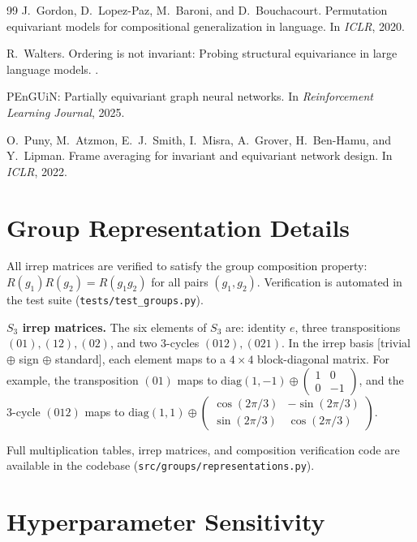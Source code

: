 \documentclass[10pt, letterpaper]{article}
\begin{document}
\begin{thebibliography}{99}
J.~Gordon, D.~Lopez-Paz, M.~Baroni, and D.~Bouchacourt.
\newblock Permutation equivariant models for compositional generalization in language.
\newblock In \emph{ICLR}, 2020.

R.~Walters.
\newblock Ordering is not invariant: Probing structural equivariance in large language models.
.

PEnGUiN: Partially equivariant graph neural networks.
\newblock In \emph{Reinforcement Learning Journal}, 2025.

O.~Puny, M.~Atzmon, E.~J.~Smith, I.~Misra, A.~Grover, H.~Ben-Hamu, and Y.~Lipman.
\newblock Frame averaging for invariant and equivariant network design.
\newblock In \emph{ICLR}, 2022.

\end{thebibliography}

\appendix

\section{Group Representation Details}
\label{app:groups}

All irrep matrices are verified to satisfy the group composition property: $R(g_1)R(g_2) = R(g_1 g_2)$ for all pairs $(g_1, g_2)$. Verification is automated in the test suite (\texttt{tests/test\_groups.py}).

\textbf{$S_3$ irrep matrices.} The six elements of $S_3$ are: identity $e$, three transpositions $(01), (12), (02)$, and two 3-cycles $(012), (021)$. In the irrep basis [trivial $\oplus$ sign $\oplus$ standard], each element maps to a $4 \times 4$ block-diagonal matrix. For example, the transposition $(01)$ maps to $\text{diag}(1, -1) \oplus \begin{pmatrix} 1 & 0 \\ 0 & -1 \end{pmatrix}$, and the 3-cycle $(012)$ maps to $\text{diag}(1, 1) \oplus \begin{pmatrix} \cos(2\pi/3) & -\sin(2\pi/3) \\ \sin(2\pi/3) & \cos(2\pi/3) \end{pmatrix}$.

Full multiplication tables, irrep matrices, and composition verification code are available in the codebase (\texttt{src/groups/representations.py}).

\section{Hyperparameter Sensitivity}
\end{document}
